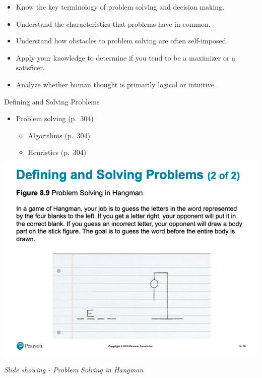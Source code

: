 \documentclass[
]{book}
\providecommand{\tightlist}{%
  \setlength{\itemsep}{0pt}\setlength{\parskip}{0pt}}
\begin{document}
\begin{reflect}
\begin{itemize}
\tightlist
\item
  Know the key terminology of problem solving and decision making.\\
\item
  Understand the characteristics that problems have in common.\\
\item
  Understand how obstacles to problem solving are often self-imposed.\\
\item
  Apply your knowledge to determine if you tend to be a maximizer or a satisficer.\\
\item
  Analyze whether human thought is primarily logical or intuitive.
\end{itemize}

Defining and Solving Problems

\begin{itemize}
\tightlist
\item
  Problem solving (p.~304)

  \begin{itemize}
  \tightlist
  \item
    Algorithms (p.~304)\\
  \item
    Heuristics (p.~304)
  \end{itemize}
\end{itemize}

\includegraphics{assets/unit_1/slide_56.png}

\emph{Slide showing - Problem Solving in Hangman}


\end{reflect}
\end{document}
